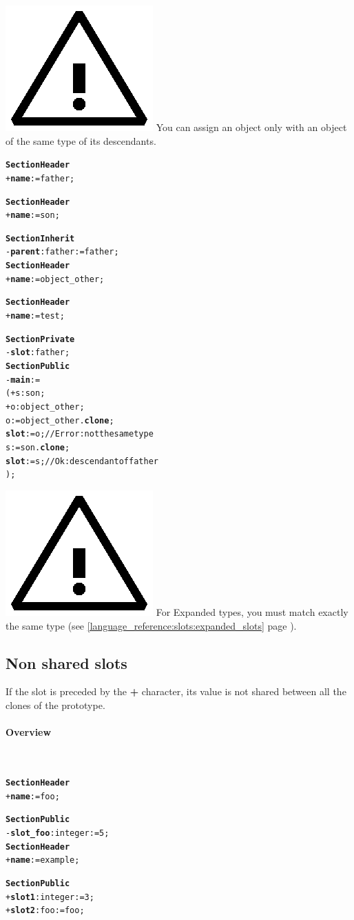 \documentclass[11pt]{mybook}
\newcommand{\warning}{\includegraphics[scale=0.3]{figures/warning}}
\begin{document}
\warning{} You can assign an object only with an object of the same type of its descendants.

\begin{alltt}
{\bf{}Section Header}
  + {\bf{}name} := {\sc{}father};

{\bf{}Section Header}
  + {\bf{}name} := {\sc{}son};

{\bf{}Section Inherit}
  - {\bf{}parent}:{\sc{}father} := {\sc{}father};\\

{\bf{}Section Header}
  + {\bf{}name} := {\sc{}object\_other};

{\bf{}Section Header}
  + {\bf{}name} := {\sc{}test};

{\bf{}Section Private}
  - {\bf{}slot}:{\sc{}father};
{\bf{}Section Public}
  - {\bf{}main} :=
  ( + s:{\sc{}son};
    + o:{\sc{}object\_other};
    o := {\sc{}object\_other}.{\bf{}clone};
    {\bf{}slot} := o;                       // Error: not the same type
    s := {\sc{}son}.{\bf{}clone};
    {\bf{}slot} := s;                        // Ok: descendant of {\sc{}father}
  );
\end{alltt}

\warning{} For Expanded types, you must match exactly the same type (see {\ref{language_reference:slots:expanded_slots}} page \pageref{language_reference:slots:expanded_slots}). 

\subsection{Non shared slots}
\label{language_reference:slots:non_shared_slots}
If the slot is preceded by the {\bf{}+} character, its value is not shared between all the clones of the prototype.
\paragraph{Overview}
 ~\\
\begin{alltt}
{\bf{}Section Header}
  + {\bf{}name} := {\sc{}foo};

{\bf{}Section Public}
  - {\bf{}slot\_foo}:{\sc{}integer} := 5;\\

{\bf{}Section Header}
  + {\bf{}name} := {\sc{}example};

{\bf{}Section Public}
  + {\bf{}slot1}:{\sc{}integer} := 3;
  + {\bf{}slot2}:{\sc{}foo} := {\sc{}foo};
\end{alltt}
\end{document}
